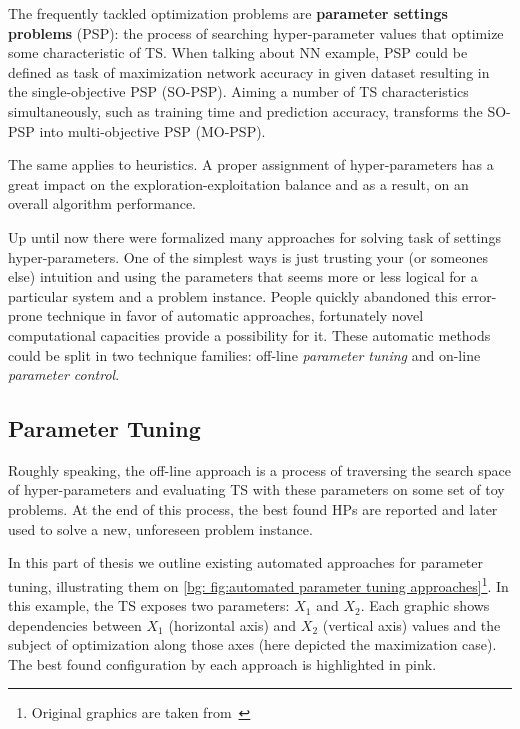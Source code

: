 The frequently tackled optimization problems are \textbf{parameter settings problems} (PSP): the process of searching hyper-parameter values that optimize some characteristic of TS. When talking about NN example, PSP could be defined as task of maximization network accuracy in given dataset resulting in the single-objective PSP (SO-PSP). Aiming a number of TS characteristics simultaneously, such as training time and prediction accuracy, transforms the SO-PSP into multi-objective PSP (MO-PSP).

The same applies to heuristics. A proper assignment of hyper-parameters has a great impact on the exploration-exploitation balance and as a result, on an overall algorithm performance.

Up until now there were formalized many approaches for solving task of settings hyper-parameters. 
One of the simplest ways is just trusting your (or someones else) intuition and using the parameters that seems more or less logical for a particular system and a problem instance. People quickly abandoned this error-prone technique in favor of automatic approaches, fortunately novel computational capacities provide a possibility for it. These automatic methods could be split in two technique families: off-line \emph{parameter tuning} and on-line \emph{parameter control}.


\subsection{Parameter Tuning}\label{bg: parameter tuning}
Roughly speaking, the off-line approach is a process of traversing the search space of hyper-parameters and evaluating TS with these parameters on some set of toy problems. At the end of this process, the best found HPs are reported and later used to solve a new, unforeseen problem instance.

In this part of thesis we outline existing automated approaches for parameter tuning, illustrating them on \cref{bg: fig:automated parameter tuning approaches}\footnote{Original graphics are taken from~\cite{koch2017automated}}. In this example, the TS exposes two parameters: $X_1$ and $X_2$. Each graphic shows dependencies between $X_1$ (horizontal axis) and $X_2$ (vertical axis) values and the subject of optimization along those axes (here depicted the maximization case). The best found configuration by each approach is highlighted in pink.

